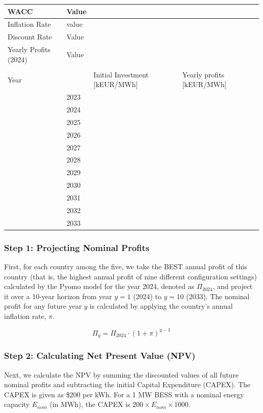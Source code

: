 \begin{table}[h]
\centering
\begin{tabular}{|l|l|l|l|}
\hline
WACC & Value & & \\
\hline
Inflation Rate & value & & \\
\hline
Discount Rate & Value & & \\
\hline
Yearly Profits (2024) & Value & & \\
\hline
\multicolumn{4}{|c|}{} \\
\hline
Year & & Initial Investment [kEUR/MWh] & Yearly profits [kEUR/MWh] \\
\hline
& 2023 & & \\
\hline
& 2024 & & \\
\hline
& 2025 & & \\
\hline
& 2026 & & \\
\hline
& 2027 & & \\
\hline
& 2028 & & \\
\hline
& 2029 & & \\
\hline
& 2030 & & \\
\hline
& 2031 & & \\
\hline
& 2032 & & \\
\hline
& 2033 & & \\
\hline
\end{tabular}
\end{table}

\subsubsection{Step 1: Projecting Nominal Profits}
First, for each country among the five, we take the BEST annual profit of this country (that is, the highest annual profit of nine different configuration settings) calculated by the Pyomo model for the year 2024, denoted as $\Pi_{2024}$, and project it over a 10-year horizon from year $y=1$ (2024) to $y=10$ (2033). The nominal profit for any future year $y$ is calculated by applying the country's annual inflation rate, $\pi$.

\begin{equation}
\Pi_y = \Pi_{2024} \cdot (1 + \pi)^{y-1}
\end{equation}

\subsubsection{Step 2: Calculating Net Present Value (NPV)}
Next, we calculate the NPV by summing the discounted values of all future nominal profits and subtracting the initial Capital Expenditure (CAPEX). The CAPEX is given as \$200 per kWh. For a 1 MW BESS with a nominal energy capacity $E_{nom}$ (in MWh), the CAPEX is $200 \times E_{nom} \times 1000$.

